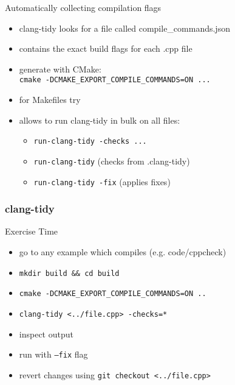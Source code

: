 \begin{frame}[fragile]
  \begin{block}{Automatically collecting compilation flags}
    \begin{itemize}
      \item clang-tidy looks for a file called compile\_commands.json
      \item contains the exact build flags for each .cpp file
      \item generate with CMake: \\
        \texttt{cmake -DCMAKE_EXPORT_COMPILE_COMMANDS=ON ...}
      \item for Makefiles try \href{https://github.com/rizsotto/Bear}{}
      \item allows to run clang-tidy in bulk on all files:
      \begin{itemize}
        \item \texttt{run-clang-tidy -checks ...}
        \item \texttt{run-clang-tidy} (checks from .clang-tidy)
        \item \texttt{run-clang-tidy -fix} (applies fixes)
      \end{itemize}
    \end{itemize}
  \end{block}
\end{frame}

\begin{frame}[fragile]
  \frametitle{clang-tidy}
  \begin{alertblock}{Exercise Time}
    \begin{itemize}
      \item go to any example which compiles (e.g. code/cppcheck)
      \item \texttt{mkdir build && cd build}
      \item \texttt{cmake -DCMAKE_EXPORT_COMPILE_COMMANDS=ON ..}
      \item \texttt{clang-tidy <../file.cpp> -checks=*}
      \item inspect output
      \item run with \texttt{--fix} flag
      \item revert changes using \texttt{git checkout <../file.cpp>}
    \end{itemize}
  \end{alertblock}
\end{frame}
